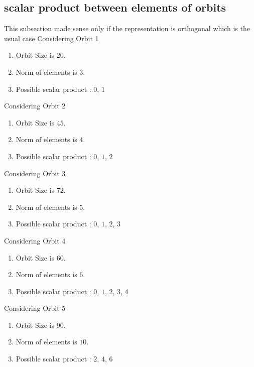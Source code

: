 \documentclass[12pt]{article}
\begin{document}
\subsection{scalar product between elements of orbits}
\noindent This subsection made sense only if the representation is orthogonal which is the usual case
Considering Orbit 1
\begin{enumerate}
\item Orbit Size is $20$.
\item Norm of elements is $3$.
\item Possible scalar product : $0$, $1$
\end{enumerate}
Considering Orbit 2
\begin{enumerate}
\item Orbit Size is $45$.
\item Norm of elements is $4$.
\item Possible scalar product : $0$, $1$, $2$
\end{enumerate}
Considering Orbit 3
\begin{enumerate}
\item Orbit Size is $72$.
\item Norm of elements is $5$.
\item Possible scalar product : $0$, $1$, $2$, $3$
\end{enumerate}
Considering Orbit 4
\begin{enumerate}
\item Orbit Size is $60$.
\item Norm of elements is $6$.
\item Possible scalar product : $0$, $1$, $2$, $3$, $4$
\end{enumerate}
Considering Orbit 5
\begin{enumerate}
\item Orbit Size is $90$.
\item Norm of elements is $10$.
\item Possible scalar product : $2$, $4$, $6$
\end{enumerate}
\end{document}
